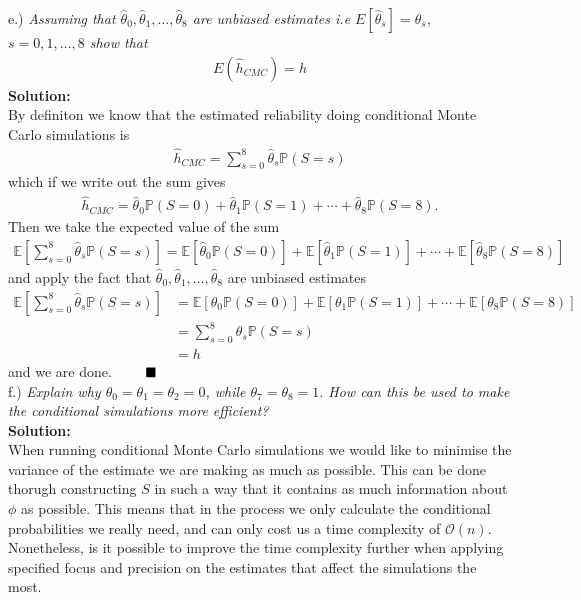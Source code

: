 \documentclass[12pt,
               a4paper,
               article,
               oneside,
               english,oldfontcommands]{memoir}
\newcommand{\Q}{ \qquad \hfill \blacksquare}
\newcommand{\spaze}{\vspace{4mm}\\}
\begin{document}
e.) \emph{Assuming that $\hat{\theta}_0 , \hat{\theta}_1, \ldots, \hat{\theta}_8$ are unbiased estimates i.e $E[\hat{\theta}_s ]= \theta_s$, $s=0, 1, \ldots, 8$ show that}
\begin{align*}
E(\hat{h}_{CMC}) = h
\end{align*}
\textbf{Solution:} \spaze 
By definiton we know that the estimated reliability doing conditional Monte Carlo simulations is 
\begin{align*}
\hat{h}_{CMC} = \sum_{s=0}^{8} \hat{\theta}_s \mathbb{P}( S = s)
\end{align*}
which if we write out the sum gives 
\begin{align*}
\hat{h}_{CMC} = \hat{\theta}_0\mathbb{P}( S = 0) +  \hat{\theta}_1\mathbb{P}( S = 1) + \cdots +  \hat{\theta}_8\mathbb{P}( S = 8).
\end{align*}
Then we take the expected value of the sum 
\begin{align*}
\mathbb{E}  \left[\sum_{s=0}^{8} \hat{\theta}_s \mathbb{P}( S = s) \right] = \mathbb{E} \left[ \hat{\theta}_0\mathbb{P}( S = 0) \right] + \mathbb{E} \left[ \hat{\theta}_1\mathbb{P}( S = 1) \right] + \cdots + \mathbb{E} \left[ \hat{\theta}_8\mathbb{P}( S = 8) \right]
\end{align*}
and apply the fact that $\hat{\theta}_0 , \hat{\theta}_1, \ldots, \hat{\theta}_8$ are unbiased estimates 
\begin{align*}
\mathbb{E}  \left[\sum_{s=0}^{8} \hat{\theta}_s \mathbb{P}( S = s) \right] &= \mathbb{E} \left[ \theta_0\mathbb{P}( S = 0) \right] + \mathbb{E} \left[ \theta_1\mathbb{P}( S = 1) \right] + \cdots + \mathbb{E} \left[ \theta_8 \mathbb{P}( S = 8) \right] \\[5pt]
&= \sum_{s=0}^{8} \theta_s \mathbb{P}( S = s) \\[5pt]
&= h
\end{align*}
and we are done. $\Q$ \spaze
f.) \emph{Explain why $ \theta_0 = \theta_1 = \theta_2 = 0$, while $\theta_7 = \theta_8 = 1.$ How can this be used to make the conditional simulations more efficient?} \spaze 
\textbf{Solution:} \spaze 
When running conditional Monte Carlo simulations we would like to minimise the variance of the estimate we are making as much as possible. This can be done thorugh constructing $S$ in such a way that it contains as much information about $\phi$ as possible. This means that in the process we only calculate the conditional probabilities we really need, and can only cost us a time complexity of $\mathcal{O}(n)$. Nonetheless, is it possible to improve the time complexity further when applying specified focus and precision on the estimates that affect the simulations the most. \vspace{2mm} \\
\end{document}
